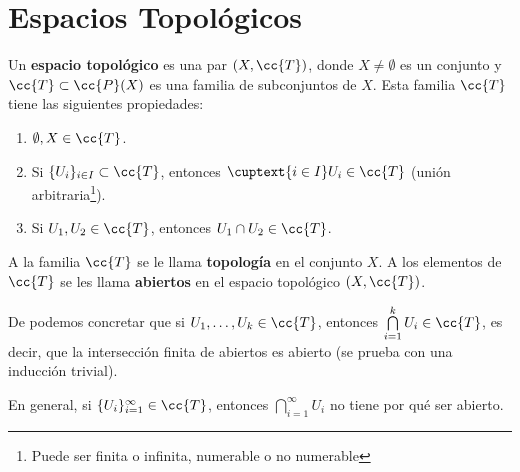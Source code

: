 
\chapter{Espacios Topológicos}

\begin{definicion}
    Un \textbf{espacio topológico} es una par $(X, \cc{T})$, donde $X \neq \emptyset$ es un conjunto y $\cc{T}\subset\cc{P}(X)$ es una familia de subconjuntos de $X$. Esta familia $\cc{T}$ tiene las siguientes propiedades:

    \begin{enumerate}
        \item[\objetivo{A1}] $\emptyset, X \in \cc{T}$.
        \item[\objetivo{A2}] Si $\{U_i\}_{i\in I} \subset \cc{T}$, entonces $\cuptext{i\in I} U_i \in \cc{T}$ (unión arbitraria\footnote{Puede ser finita o infinita, numerable o no numerable}).
        \item[\objetivo{A3}] Si $U_1, U_2 \in \cc{T}$, entonces $U_1 \cap U_2 \in \cc{T}$.
    \end{enumerate}

    A la familia $\cc{T}$ se le llama \textbf{topología} en el conjunto $X$. A los elementos de $\cc{T}$ se les llama \textbf{abiertos} en el espacio topológico $(X, \cc{T})$.
    \endsquare
\end{definicion}

\begin{observacion}
    De  podemos concretar que si $U_1, \dots, U_k \in \cc{T}$, entonces $\bigcap\limits_{i=1}^{k}U_i \in \cc{T}$, es decir, que la intersección finita de abiertos es abierto (se prueba con una inducción trivial).

    En general, si $\{U_i\}_{i=1}^{\infty}\in \cc{T}$, entonces $\bigcap\limits_{i=1}^{\infty}U_i$ no tiene por qué ser abierto.
    \endsquare
\end{observacion}

